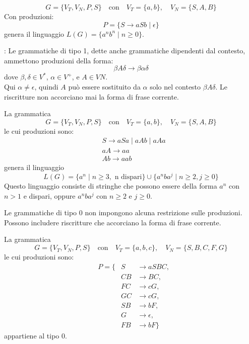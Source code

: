 \documentclass{article}
\begin{document}
\begin{example}
\[
G = \{V_T, V_N,P, S\} \quad \text{con} \quad V_T = \{a, b\}, \quad V_N = \{S, A, B\}
\]
Con produzioni:
\[
P = \{S \rightarrow aSb \mid \epsilon\}
\]
genera il linguaggio \( L(G) = \{a^n b^n \mid n \geq 0\} \). 
\end{example}
\begin{definition} : Le grammatiche di tipo 1, dette anche grammatiche dipendenti dal contesto, ammettono produzioni della forma:
    \[
    \beta A \delta \rightarrow \beta \alpha \delta
    \]
    dove \( \beta, \delta \in V^* \), \( \alpha \in V^+ \), e \( A \in VN \).
\\\noindent 
Qui \( \alpha \neq \epsilon \), quindi \( A \) può essere sostituito da \( \alpha \) solo nel contesto \( \beta A \delta \). Le riscritture non accorciano mai la forma di frase corrente.\\
\end{definition} 
\begin{example}
La grammatica
\[
G = \{V_T, V_N, P, S\} \quad \text{con} \quad V_T = \{a, b\}, \quad V_N = \{S, A, B\}
\]
le cui produzioni sono:
\[
\begin{aligned}
    & S \rightarrow aSa \mid aAb \mid aAa \\
    & aA \rightarrow aa \\
    & Ab \rightarrow aab
\end{aligned}
\]
genera il linguaggio
\[
L(G) = \{ a^n \mid n \geq 3, \text{ n dispari} \} \cup \{ a^n b a^j \mid n \geq 2, j \geq 0 \}
\]
Questo linguaggio consiste di stringhe che possono essere della forma \( a^n \) con \( n > 1 \) e dispari, oppure \( a^n b a^j \) con \( n \geq 2 \) e \( j \geq 0 \).\\
\end{example}
\begin{definition}
\noindent Le grammatiche di tipo 0 non impongono alcuna restrizione sulle produzioni. Possono includere riscritture che accorciano la forma di frase corrente.
\end{definition}
\begin{example}
La grammatica
\[
G = \{V_T, V_N,P, S\} \quad \text{con} \quad V_T = \{a, b, c\}, \quad V_N = \{S, B, C, F, G\}
\]
le cui produzioni sono:
\[
\begin{aligned}
&P = \{ & S &\rightarrow aSBC, \\
& & CB &\rightarrow BC, \\
& & FC &\rightarrow cG, \\
& & GC &\rightarrow cG, \\
& & SB &\rightarrow bF, \\
& & G &\rightarrow \epsilon, \\
& & FB &\rightarrow bF \}
\end{aligned}
\]
appartiene al tipo 0.
\end{example}
\end{document}
